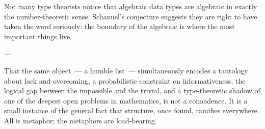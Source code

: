 Not many type theorists notice that {\itfont algebraic\/} data types are algebraic
in exactly the number-theoretic sense. Schanuel's conjecture suggests they are
right to have taken the word seriously: the boundary of the algebraic is where
the most important things live.

\medskip
\centerline{---}
\medskip

{\itfont That the same object~--- a humble list~--- simultaneously encodes a
tautology about lack and overcoming, a probabilistic constraint on
informativeness, the logical gap between the impossible and the trivial, and a
type-theoretic shadow of one of the deepest open problems in mathematics, is not
a coincidence. It is a small instance of the general fact that structure, once
found, ramifies everywhere. All is metaphor; the metaphors are load-bearing.\/}

\vfill
\bye